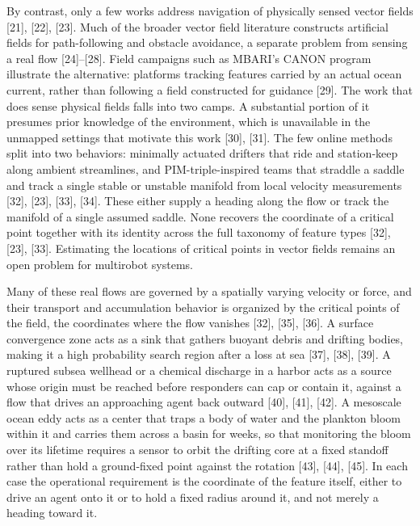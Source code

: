 \documentclass[lettersize,journal]{IEEEtran}
\begin{document}
By contrast, only a few works address navigation of physically sensed vector fields [21], [22], [23]. Much of the broader vector field literature constructs artificial fields for path-following and obstacle avoidance, a separate problem from sensing a real flow [24]--[28]. Field campaigns such as MBARI's CANON program illustrate the alternative: platforms tracking features carried by an actual ocean current, rather than following a field constructed for guidance [29]. The work that does sense physical fields falls into two camps. A substantial portion of it presumes prior knowledge of the environment, which is unavailable in the unmapped settings that motivate this work [30], [31]. The few online methods split into two behaviors: minimally actuated drifters that ride and station-keep along ambient streamlines, and PIM-triple-inspired teams that straddle a saddle and track a single stable or unstable manifold from local velocity measurements [32], [23], [33], [34]. These either supply a heading along the flow or track the manifold of a single assumed saddle. None recovers the coordinate of a critical point together with its identity across the full taxonomy of feature types [32], [23], [33]. Estimating the locations of critical points in vector fields remains an open problem for multirobot systems.

Many of these real flows are governed by a spatially varying velocity or force, and their transport and accumulation behavior is organized by the critical points of the field, the coordinates where the flow vanishes [32], [35], [36]. A surface convergence zone acts as a sink that gathers buoyant debris and drifting bodies, making it a high probability search region after a loss at sea [37], [38], [39]. A ruptured subsea wellhead or a chemical discharge in a harbor acts as a source whose origin must be reached before responders can cap or contain it, against a flow that drives an approaching agent back outward [40], [41], [42]. A mesoscale ocean eddy acts as a center that traps a body of water and the plankton bloom within it and carries them across a basin for weeks, so that monitoring the bloom over its lifetime requires a sensor to orbit the drifting core at a fixed standoff rather than hold a ground-fixed point against the rotation [43], [44], [45]. In each case the operational requirement is the coordinate of the feature itself, either to drive an agent onto it or to hold a fixed radius around it, and not merely a heading toward it.
\end{document}
